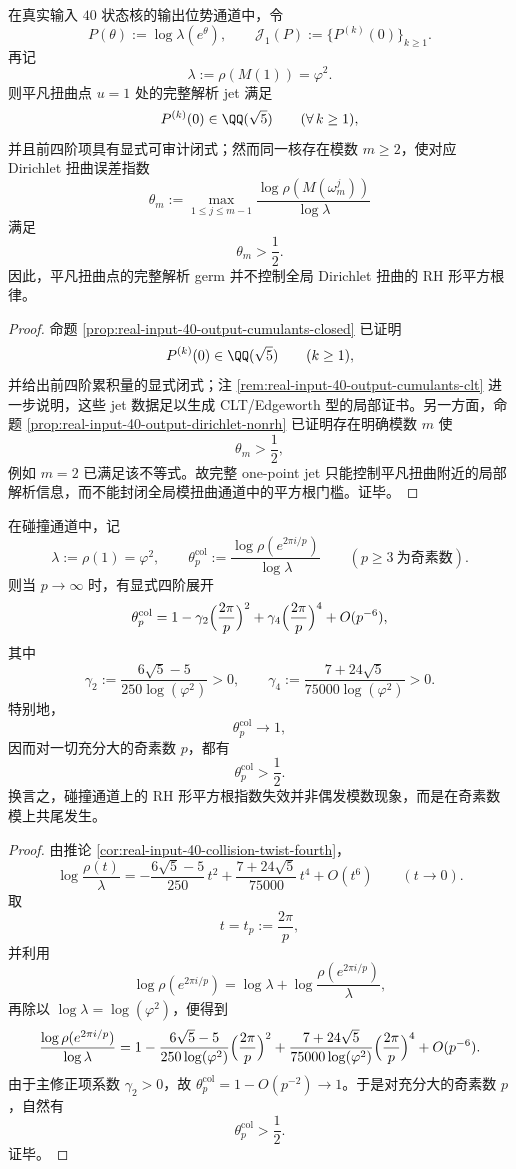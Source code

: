 \begin{theorem}\label{thm:conclusion-trivial-twist-complete-jet-failure}
在真实输入 \(40\) 状态核的输出位势通道中，令
\[
P(\theta):=\log\lambda(e^\theta),
\qquad
\mathcal J_1(P):=\{P^{(k)}(0)\}_{k\ge 1}.
\]
再记
\[
\lambda:=\rho(M(1))=\varphi^2.
\]
则平凡扭曲点 \(u=1\) 处的完整解析 jet 满足
\[
P^{(k)}(0)\in\QQ(\sqrt5)
\qquad(\forall\,k\ge 1),
\]
并且前四阶项具有显式可审计闭式；然而同一核存在模数 \(m\ge 2\)，使对应 Dirichlet 扭曲误差指数
\[
\theta_m:=\max_{1\le j\le m-1}\frac{\log\rho(M(\omega_m^j))}{\log\lambda}
\]
满足
\[
\theta_m>\frac12.
\]
因此，平凡扭曲点的完整解析 germ 并不控制全局 Dirichlet 扭曲的 RH 形平方根律。
\end{theorem}
\begin{proof}
命题 \ref{prop:real-input-40-output-cumulants-closed} 已证明
\[
P^{(k)}(0)\in\QQ(\sqrt5)
\qquad(k\ge 1),
\]
并给出前四阶累积量的显式闭式；注 \ref{rem:real-input-40-output-cumulants-clt} 进一步说明，这些 jet 数据足以生成 CLT/Edgeworth 型的局部证书。另一方面，命题 \ref{prop:real-input-40-output-dirichlet-nonrh} 已证明存在明确模数 \(m\) 使
\[
\theta_m>\frac12,
\]
例如 \(m=2\) 已满足该不等式。故完整 one-point jet 只能控制平凡扭曲附近的局部解析信息，而不能封闭全局模扭曲通道中的平方根门槛。证毕。
\end{proof}

\begin{theorem}\label{thm:conclusion-collision-odd-prime-cofinal-nonrh}
在碰撞通道中，记
\[
\lambda:=\rho(1)=\varphi^2,
\qquad
\theta_p^{\mathrm{col}}:=
\frac{\log\rho(e^{2\pi i/p})}{\log\lambda}
\qquad(p\ge 3\ \text{为奇素数}).
\]
则当 \(p\to\infty\) 时，有显式四阶展开
\[
\theta_p^{\mathrm{col}}
=
1-\gamma_2\Bigl(\frac{2\pi}{p}\Bigr)^2
+\gamma_4\Bigl(\frac{2\pi}{p}\Bigr)^4
+O(p^{-6}),
\]
其中
\[
\gamma_2:=\frac{6\sqrt5-5}{250\log(\varphi^2)}>0,
\qquad
\gamma_4:=\frac{7+24\sqrt5}{75000\log(\varphi^2)}>0.
\]
特别地，
\[
\theta_p^{\mathrm{col}}\longrightarrow 1,
\]
因而对一切充分大的奇素数 \(p\)，都有
\[
\theta_p^{\mathrm{col}}>\frac12.
\]
换言之，碰撞通道上的 RH 形平方根指数失效并非偶发模数现象，而是在奇素数模上共尾发生。
\end{theorem}
\begin{proof}
由推论 \ref{cor:real-input-40-collision-twist-fourth}，
\[
\log\frac{\rho(t)}{\lambda}
=
-\frac{6\sqrt5-5}{250}\,t^2
+\frac{7+24\sqrt5}{75000}\,t^4
+O(t^6)
\qquad(t\to 0).
\]
取
\[
t=t_p:=\frac{2\pi}{p},
\]
并利用
\[
\log\rho(e^{2\pi i/p})
=
\log\lambda+\log\frac{\rho(e^{2\pi i/p})}{\lambda},
\]
再除以 \(\log\lambda=\log(\varphi^2)\)，便得到
\[
\frac{\log\rho(e^{2\pi i/p})}{\log\lambda}
=
1-\frac{6\sqrt5-5}{250\log(\varphi^2)}\Bigl(\frac{2\pi}{p}\Bigr)^2
+\frac{7+24\sqrt5}{75000\log(\varphi^2)}\Bigl(\frac{2\pi}{p}\Bigr)^4
+O(p^{-6}).
\]
由于主修正项系数 \(\gamma_2>0\)，故 \(\theta_p^{\mathrm{col}}=1-O(p^{-2})\to 1\)。于是对充分大的奇素数 \(p\)，自然有
\[
\theta_p^{\mathrm{col}}>\frac12.
\]
证毕。
\end{proof}

